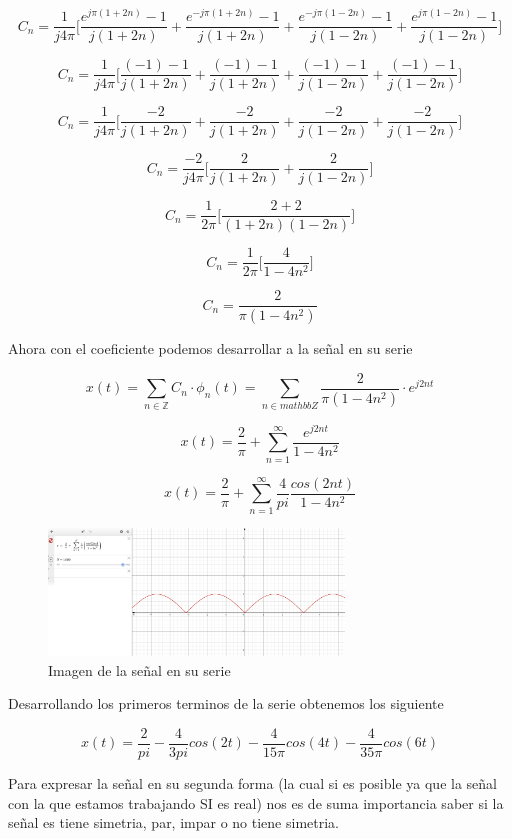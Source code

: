 $$C_n = \dfrac{1}{j4\pi} \bigg[\dfrac{e^{j\pi(1+2n)}-1}{j(1+2n)} + \dfrac{e^{-j\pi(1+2n)}-1}{j(1+2n)} + \dfrac{e^{-j\pi(1-2n)}-1}{j(1-2n)} + \dfrac{e^{j\pi(1-2n)}-1}{j(1-2n)} \bigg] $$

$$C_n = \dfrac{1}{j4\pi} \bigg[\dfrac{(-1)-1}{j(1+2n)} + \dfrac{(-1)-1}{j(1+2n)} + \dfrac{(-1)-1}{j(1-2n)} + \dfrac{(-1)-1}{j(1-2n)} \bigg] $$

$$C_n = \dfrac{1}{j4\pi} \bigg[\dfrac{-2}{j(1+2n)} + \dfrac{-2}{j(1+2n)} + \dfrac{-2}{j(1-2n)} + \dfrac{-2}{j(1-2n)} \bigg] $$

$$C_n = \dfrac{-2}{j4\pi} \bigg[\dfrac{2}{j(1+2n)} + \dfrac{2}{j(1-2n)} \bigg] $$

$$C_n = \dfrac{1}{2\pi} \bigg[\dfrac{2+2}{(1+2n)(1-2n)}\bigg] $$

$$C_n = \dfrac{1}{2\pi} \bigg[\dfrac{4}{1-4n^2} \bigg] $$

$$C_n = \dfrac{2}{\pi(1-4n^2)} $$

Ahora con el coeficiente podemos desarrollar a la se\~nal en su serie

\[x(t) = \sum_{n \in \mathbb{Z}} C_n \cdot \phi_n (t) = \sum_{n \in mathbb{Z}} \dfrac{2}{\pi(1-4n^2)} \cdot e^{j2nt}\]

\[x(t) = \dfrac{2}{\pi} + \sum_{n=1}^{\infty} \dfrac{e^{j2nt}}{1-4n^2} \]

\[x(t) = \dfrac{2}{\pi} + \sum_{n=1}^{\infty} \dfrac{4}{pi} \dfrac{cos(2nt)}{1-4n^2} \]

\begin{figure}[H]
  \centering
  \includegraphics[width=0.7\textwidth]{photos/graf_onda_completa.png}
  \caption{Imagen de la se\~nal en su serie}
\end{figure}

Desarrollando los primeros terminos de la serie obtenemos los siguiente

\[x(t) = \dfrac{2}{pi} - \dfrac{4}{3pi} cos(2t) - \dfrac{4}{15\pi} cos(4t) - \dfrac{4}{35\pi} cos(6t)\]

Para expresar la se\~nal en su segunda forma (la cual si es posible ya que la se\~nal con la que estamos trabajando SI es real) nos es de suma importancia saber si la se\~nal es tiene simetria, par, impar o no tiene simetria.

